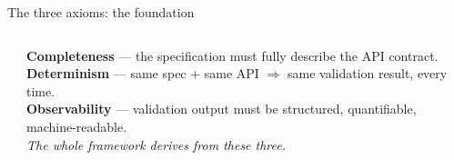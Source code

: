 \documentclass[10pt,aspectratio=169]{beamer}
\begin{document}

\begin{frame}{The three axioms: the foundation}

\begin{columns}[c,onlytextwidth]

\begin{center}
\end{center}

\footnotesize
\textbf{Completeness} — the specification must fully describe the API
contract.\\[1ex]

\textbf{Determinism} — same spec + same API $\Rightarrow$ same validation
result, every time.\\[1ex]

\textbf{Observability} — validation output must be structured,
quantifiable, machine-readable.\\[2ex]

\textit{The whole framework derives from these three.}

\end{columns}

\end{frame}
\end{document}
